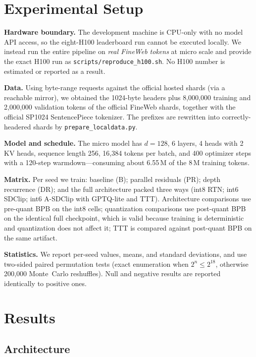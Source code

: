 \documentclass[10pt]{article}
\begin{document}
\section{Experimental Setup}

\textbf{Hardware boundary.} The development machine is CPU-only with no model API
access, so the eight-H100 leaderboard run cannot be executed locally. We instead run the
entire pipeline on \emph{real FineWeb tokens} at micro scale and provide the exact H100
run as \texttt{scripts/reproduce\_h100.sh}. No H100 number is estimated or reported as a
result.

\textbf{Data.} Using byte-range requests against the official hosted shards (via a
reachable mirror), we obtained the 1024-byte headers plus 8,000,000 training and
2,000,000 validation tokens of the official FineWeb shards, together with the official
SP1024 SentencePiece tokenizer. The prefixes are rewritten into correctly-headered
shards by \texttt{prepare\_localdata.py}.

\textbf{Model and schedule.} The micro model has $d=128$, 6 layers, 4 heads with 2 KV
heads, sequence length 256, 16,384 tokens per batch, and 400 optimizer steps with a
120-step warmdown---consuming about 6.55\,M of the 8\,M training tokens.

\textbf{Matrix.} Per seed we train: baseline (B); parallel residuals (PR); depth
recurrence (DR); and the full architecture packed three ways (int8 RTN; int6 SDClip;
int6 A-SDClip with GPTQ-lite and TTT). Architecture comparisons use pre-quant BPB on
the int8 cells; quantization comparisons use post-quant BPB on the identical full
checkpoint, which is valid because training is deterministic and quantization does not
affect it; TTT is compared against post-quant BPB on the same artifact.

\textbf{Statistics.} We report per-seed values, means, and standard deviations, and use
two-sided paired permutation tests (exact enumeration when $2^n\leq 2^{18}$, otherwise
200,000 Monte~Carlo reshuffles). Null and negative results are reported identically to
positive ones.

\section{Results}

\subsection{Architecture}
\begin{center}

\end{center}
\end{document}
